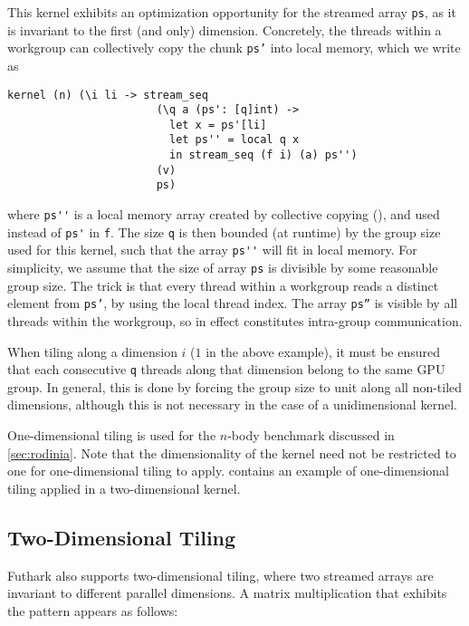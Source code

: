 This kernel exhibits an optimization opportunity for the streamed
array \lstinline{ps}, as it is invariant to the first (and only)
dimension.  Concretely, the threads within a workgroup can
collectively copy the chunk \texttt{ps'} into local memory, which we
write as
\begin{lstlisting}
kernel (n) (\i li -> stream_seq
                       (\q a (ps': [q]int) ->
                         let x = ps'[li]
                         let ps'' = local q x
                         in stream_seq (f i) (a) ps'')
                       (v)
                       ps)
\end{lstlisting}
\noindent where \lstinline{ps''} is a local memory array created by
collective copying (), and used instead of \lstinline{ps'}
in \lstinline{f}. The size \lstinline{q} is then bounded (at runtime)
by the group size used for this kernel, such that the array
\lstinline{ps''} will fit in local memory.  For simplicity, we assume
that the size of array \texttt{ps} is divisible by some reasonable
group size.  The trick is that every thread within a workgroup reads a
distinct element from \texttt{ps'}, by using the local thread index.
The array \texttt{ps''} is visible by all threads within the
workgroup, so  in effect constitutes intra-group
communication.

When tiling along a dimension $i$ ($1$ in the above example), it must
be ensured that each consecutive \lstinline{q} threads along that
dimension belong to the same GPU group.  In general, this is done by
forcing the group size to unit along all non-tiled dimensions,
although this is not necessary in the case of a unidimensional kernel.

One-dimensional tiling is used for the $n$-body benchmark discussed in
\cref{sec:rodinia}.  Note that the dimensionality of the kernel need
not be restricted to one for one-dimensional tiling to apply.
 contains an example of one-dimensional tiling
applied in a two-dimensional kernel.

\subsection{Two-Dimensional Tiling}
\label{sec:two-dimensional-tiling}

Futhark also supports two-dimensional tiling, where two streamed
arrays are invariant to different parallel dimensions.  A matrix
multiplication that exhibits the pattern appears as follows:


